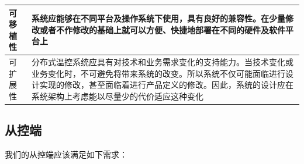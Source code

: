 \documentclass[blue,normal,cn]{elegantnote}
\begin{document}
\begin{center}
\begin{tabular}{|>{\centering}m{}|m{}|}
		\hline
		可移植性          & 系统应能够在不同平台及操作系统下使用，具有良好的兼容性。在少量修改或者不作修改的基础上就可以方便、快捷地部署在不同的硬件及软件平台上                                                                                                       \\
		\hline
		可扩展性          & 分布式温控系统应具有对技术和业务需求变化的支持能力。当技术变化或业务变化时，不可避免将带来系统的改变。所以系统不仅可能面临进行设计实现的修改，甚至面临着进行产品定义的修改。因此，系统的设计应在系统架构上考虑能以尽量少的代价适应这种变化 \\
		\hline
	\end{tabular}
\end{center}

\subsection{从控端}
我们的从控端应该满足如下需求：
\end{document}
